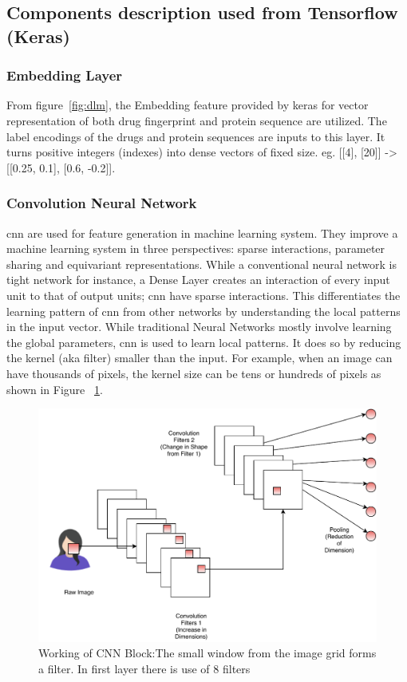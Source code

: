   \subsection{Components description used from Tensorflow (Keras)}
  \subsubsection{Embedding Layer}
  From figure~\ref{fig:dlm}, the Embedding feature provided by keras for vector representation of both drug fingerprint and protein sequence are utilized. The label encodings of the drugs and protein sequences are inputs to this layer. It turns positive integers (indexes) into dense vectors of fixed size. eg. [[4], [20]] -> [[0.25, 0.1], [0.6, -0.2]].
 
  \subsubsection{Convolution Neural Network}
  \acrfull{cnn} are used for feature generation in machine learning system. They improve a machine learning system in three perspectives: sparse interactions, parameter sharing and equivariant representations. While a conventional neural network is tight network for instance, a Dense Layer creates an interaction of every input unit to that of output units; \acrshort{cnn} have sparse interactions. This differentiates the learning pattern of \acrshort{cnn} from other networks by understanding the local patterns in the input vector. While traditional Neural Networks mostly involve learning the global parameters, \acrshort{cnn} is used to learn local patterns. It does so by reducing the kernel (aka filter) smaller than the input. For example, when an image can have thousands of pixels, the kernel size can be tens or hundreds of pixels as shown in Figure ~\ref{fig:cnn}. 
  
  
  \begin{figure}[H]
    \centering
    \includegraphics[width=1\linewidth]{mainmatter/3-Methodology/images/System-Block-CNN-Layer.pdf}
    \caption[Working of CNN Block]{Working of CNN Block:The small window from the image grid forms a filter. In first layer there is use of 8 filters}
    \label{fig:cnn}
  \end{figure}
  
